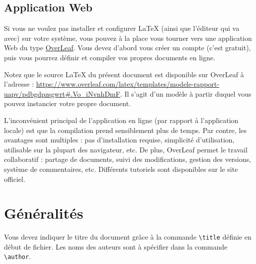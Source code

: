 \documentclass{ceri}
\begin{document}
\subsection{Application Web}
Si vous ne voulez pas installer et configurer \LaTeX{} (ainsi que l'éditeur qui va avec) sur votre système, vous pouvez à la place vous tourner vers une application Web du type \href{https://www.overleaf.com/signup?ref=d62cb1694be6}{OverLeaf}. Vous devez d'abord vous créer un compte (c'est gratuit), puis vous pourrez définir et compiler vos propres documents en ligne. 

Notez que le source \LaTeX{}  du présent document est disponible sur OverLeaf à l'adresse : \url{https://www.overleaf.com/latex/templates/modele-rapport-uapv/pdbgdpzsgwrt\#.Vo_iNvnhDmF}. Il s'agit d'un modèle à partir duquel vous pouvez instancier votre propre document.

L'inconvénient principal de l'application en ligne (par rapport à l'application locale) est que la compilation prend sensiblement plus de temps. Par contre, les avantages sont multiples :  pas d'installation requise, simplicité d'utilisation, utilisable sur la plupart des navigateur, etc. De plus, OverLeaf permet le travail collaboratif : partage de documents, suivi des modifications, gestion des versions, système de commentaires, etc. Différents tutoriels sont disponibles sur le site officiel.



\section{Généralités}
Vous devez indiquer le titre du document grâce à la commande \texttt{\textbackslash{}title} définie en début de fichier. Les noms des auteurs sont à spécifier dans la commande \texttt{\textbackslash{}author}.
\end{document}
